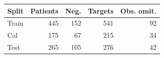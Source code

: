 \begin{tabular}{lrrrr}
\toprule
Split & Patients & Neg. & Targets & Obs. omit. \\
\midrule
Train & 445 & 152 & 541 & 92 \\
Cal & 175 & 67 & 215 & 34 \\
Test & 265 & 105 & 276 & 42 \\
\bottomrule
\end{tabular}
